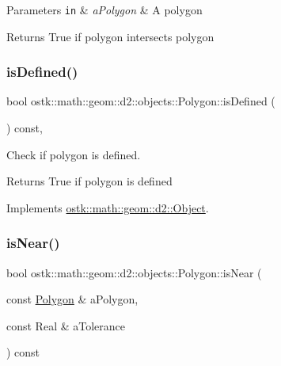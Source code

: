 \begin{DoxyParams}[1]{Parameters}
\mbox{\tt in}  & {\em a\+Polygon} & A polygon \\
\hline
\end{DoxyParams}
\begin{DoxyReturn}{Returns}
True if polygon intersects polygon 
\end{DoxyReturn}
\mbox{\label{classostk_1_1math_1_1geom_1_1d2_1_1objects_1_1_polygon_a81f92393dad2c6421fd4fe3834f60fa2}} 
\subsubsection{\texorpdfstring{is\+Defined()}{isDefined()}}
{\footnotesize\ttfamily bool ostk\+::math\+::geom\+::d2\+::objects\+::\+Polygon\+::is\+Defined (\begin{DoxyParamCaption}{ }\end{DoxyParamCaption}) const\hspace{0.3cm}{\ttfamily [override]}, {\ttfamily [virtual]}}



Check if polygon is defined. 

\begin{DoxyReturn}{Returns}
True if polygon is defined 
\end{DoxyReturn}


Implements \hyperlink{classostk_1_1math_1_1geom_1_1d2_1_1_object_a456cc7121218d24c1322d0fe54230cc4}{ostk\+::math\+::geom\+::d2\+::\+Object}.

\mbox{\label{classostk_1_1math_1_1geom_1_1d2_1_1objects_1_1_polygon_a70a128f7d670604478947243e8a96937}} 
\subsubsection{\texorpdfstring{is\+Near()}{isNear()}}
{\footnotesize\ttfamily bool ostk\+::math\+::geom\+::d2\+::objects\+::\+Polygon\+::is\+Near (\begin{DoxyParamCaption}\item[{const \hyperlink{classostk_1_1math_1_1geom_1_1d2_1_1objects_1_1_polygon}{Polygon} \&}]{a\+Polygon,  }\item[{const Real \&}]{a\+Tolerance }\end{DoxyParamCaption}) const}



